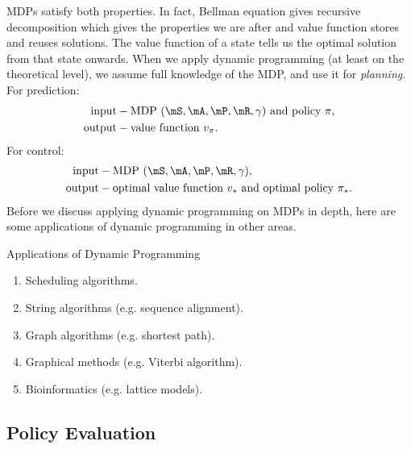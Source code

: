 \documentclass[RL]{subfiles}
\begin{document}
    \np MDPs satisfy both properties. In fact, Bellman equation gives recursive decomposition which gives the properties we are after and value function stores and reuses solutions. The value function of a state tells us the optimal solution from that state onwards.  \np When we apply dynamic programming (at least on the theoretical level), we assume full knowledge of the MDP, and use it for \textit{planning}. For prediction: \begin{equation*}
        \begin{aligned}
            \text{input} & - \text{MDP $\left( \mS,\mA,\mP,\mR,\gamma \right)$ and policy $\pi$,} \\
            \text{output} & - \text{value function $v_{\pi}$.}
        \end{aligned} 
    \end{equation*}
    For control:
    \begin{equation*}
        \begin{aligned}
            \text{input} & - \text{MDP $\left( \mS,\mA,\mP,\mR,\gamma \right)$,} \\
            \text{output} & - \text{optimal value function $v_{*}$ and optimal policy $\pi_*$.}
        \end{aligned} 
    \end{equation*}
    Before we discuss applying dynamic programming on MDPs in depth, here are some applications of dynamic programming in other areas.

    \begin{example}{Applications of Dynamic Programming}
        \vspace{-11pt}
        \begin{enumerate}
            \item Scheduling algorithms.
            \item String algorithms (e.g. sequence alignment).
            \item Graph algorithms (e.g. shortest path).
            \item Graphical methods (e.g. Viterbi algorithm).
            \item Bioinformatics (e.g. lattice models).
        \end{enumerate}
    \end{example}

    \rruleline
    
    \clearpage

    \subsection{Policy Evaluation}
\end{document}

